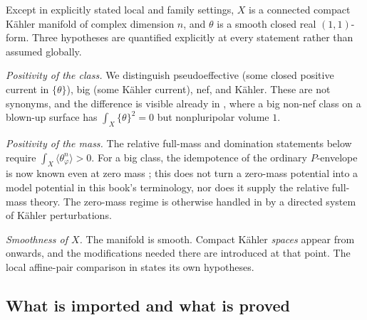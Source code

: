 Except in explicitly stated local and family settings, $X$ is a
connected compact K\"ahler manifold of complex dimension $n$, and
$\theta$ is a smooth closed real $(1,1)$-form.
Three hypotheses are quantified explicitly at every statement rather than
assumed globally.

\emph{Positivity of the class.}  We distinguish pseudoeffective (some
closed positive current in $\{\theta\}$), big (some K\"ahler current),
nef, and K\"ahler.  These are not synonyms, and the difference is visible
already in , where a big non-nef class on a
blown-up surface has $\int_X\{\theta\}^2=0$ but nonpluripolar volume
$1$.

\emph{Positivity of the mass.}  The relative full-mass and domination
statements below require $\int_X\langle\theta_\varphi^n\rangle>0$.
For a big class, the idempotence of the ordinary $P$-envelope is now
known even at zero mass \cite[Theorem~1.2]{PSWZ26}; this does not turn a
zero-mass potential into a model potential in this book's terminology, nor
does it supply the relative full-mass theory.  The zero-mass regime is
otherwise handled in  by a directed
system of K\"ahler perturbations.

\emph{Smoothness of $X$.}  The manifold is smooth.  Compact K\"ahler
\emph{spaces} appear from  onwards, and
the modifications needed there are introduced at that point.  The local
affine-pair comparison in  states its own
hypotheses.

\subsection{What is imported and what is proved}
\label{sec:ch51-imported}

